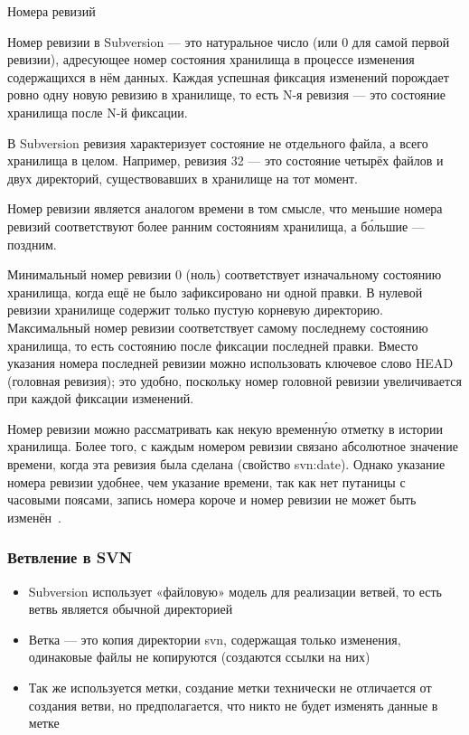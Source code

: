 \documentclass{../industrial-development}
\begin{document}
\lecturenotes

Номера ревизий

Номер ревизии в Subversion — это натуральное число (или 0 для самой первой ревизии), адресующее номер состояния хранилища в процессе изменения содержащихся в нём данных. Каждая успешная фиксация изменений порождает ровно одну новую ревизию в хранилище, то есть N-я ревизия — это состояние хранилища после N-й фиксации.

В Subversion ревизия характеризует состояние не отдельного файла, а всего хранилища в целом. Например, ревизия 32 — это состояние четырёх файлов и двух директорий, существовавших в хранилище на тот момент.

Номер ревизии является аналогом времени в том смысле, что меньшие номера ревизий соответствуют более ранним состояниям хранилища, а бо́льшие — поздним.

Минимальный номер ревизии 0 (ноль) соответствует изначальному состоянию хранилища, когда ещё не было зафиксировано ни одной правки. В нулевой ревизии хранилище содержит только пустую корневую директорию.
Максимальный номер ревизии соответствует самому последнему состоянию хранилища, то есть состоянию после фиксации последней правки. Вместо указания номера последней ревизии можно использовать ключевое слово HEAD (головная ревизия); это удобно, поскольку номер головной ревизии увеличивается при каждой фиксации изменений.

Номер ревизии можно рассматривать как некую временну́ю отметку в истории хранилища. Более того, с каждым номером ревизии связано абсолютное значение времени, когда эта ревизия была сделана (свойство svn:date). Однако указание номера ревизии удобнее, чем указание времени, так как нет путаницы с часовыми поясами, запись номера короче и номер ревизии не может быть изменён~\cite{SVNWikipedia}.

\begin{frame} \frametitle{Ветвление в SVN}
  
  \begin{itemize}
  \item Subversion использует «файловую» модель для реализации ветвей, то есть ветвь является обычной директорией
  \item Ветка --- это копия директории svn, содержащая только изменения, одинаковые файлы не копируются (создаются ссылки на них)
  \item Так же используется метки, создание метки технически не отличается от создания ветви, но предполагается, что никто не будет изменять данные в метке
  \end{itemize}
\end{frame}
\end{document}
